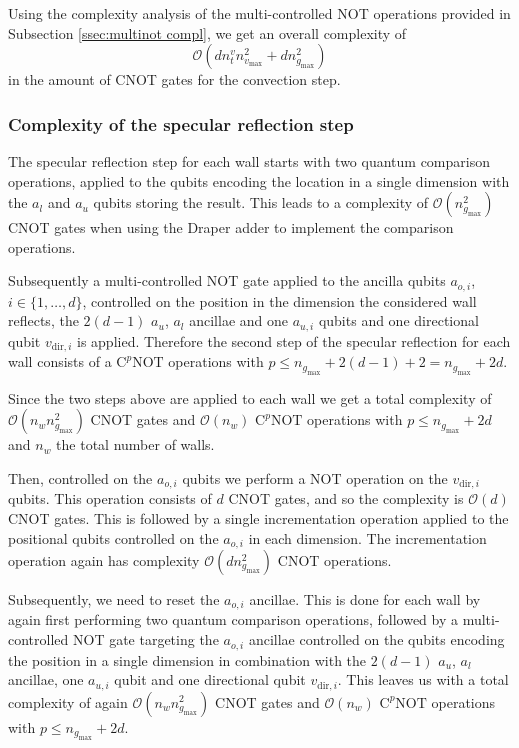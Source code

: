 Using the complexity analysis of the multi-controlled NOT operations provided in Subsection \ref{ssec:multinot compl}, we get an overall complexity of $$\mathcal{O} \left ( d n^v_t n_{v_\text{max}}^2 + d n_{g_\text{max}}^2 \right )$$ in the amount of CNOT gates for the convection step.

\subsubsection{Complexity of the specular reflection step}
The specular reflection step for each wall starts with two quantum comparison operations, applied to the qubits encoding the location in a single dimension with the $a_{l}$ and $a_{u}$ qubits storing the result. This leads to a complexity of $\mathcal{O} \left ( n_{g_\text{max}}^2 \right) $ CNOT gates when using the Draper adder \cite{Draper1998} to implement the comparison operations. 

Subsequently a multi-controlled NOT gate applied to the ancilla qubits $a_{o,i}$, $i \in \{1,\dots,d\}$, controlled on the position in the dimension the considered wall reflects, the $2(d-1)$ $a_{u}$, $a_{l}$ ancillae and one $a_{u,i}$ qubits and one directional qubit $v_{\text{dir},i}$ is applied. Therefore the second step of the specular reflection for each wall consists of a $\text{C}^{p}\text{NOT}$ operations with $p \leq n_{g_\text{max}} +2\left ( d-1 \right ) +2 =  n_{g_\text{max}} +2d$. 

Since the two steps above are applied to each wall we get a total complexity of $\mathcal{O} \left ( n_w n_{g_\text{max}}^2 \right) $ CNOT gates and $\mathcal{O}\left ( n_w \right )$ $\text{C}^{p}\text{NOT}$ operations with $p \leq n_{g_\text{max}} +2d$ and $n_w$ the total number of walls. 

Then, controlled on the $a_{o,i}$ qubits we perform a NOT operation on the $v_{\text{dir},i}$ qubits. This operation consists of $d$ CNOT gates, and so the complexity is $\mathcal{O}\left ( d\right )$ CNOT gates. This is followed by a single incrementation operation applied to the positional qubits controlled on the $a_{o,i}$ in each dimension. 
The incrementation operation again has complexity $\mathcal{O} \left (d n_{g_\text{max}}^2 \right )$ CNOT operations. 

Subsequently, we need to reset the $a_{o,i}$ ancillae. 
This is done for each wall by again first performing two quantum comparison operations, followed by a multi-controlled NOT gate targeting the $a_{o,i}$ ancillae controlled on the qubits encoding the position in a single dimension in combination with the $2(d-1)$ $a_{u}$, $a_{l}$ ancillae, one $a_{u,i}$ qubit and one directional qubit $v_{\text{dir},i}$. This leaves us with a total complexity of again $\mathcal{O} \left ( n_w n_{g_\text{max}}^2 \right) $ CNOT gates and $\mathcal{O}\left ( n_w \right )$ $\text{C}^{p}\text{NOT}$ operations with $p \leq n_{g_\text{max}} +2d$.

